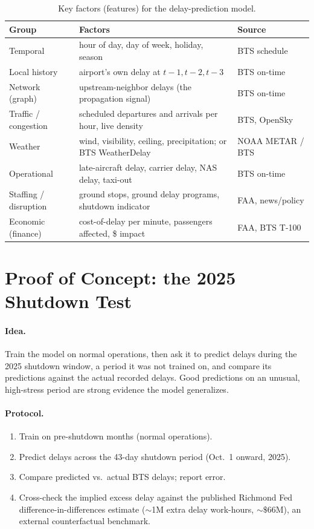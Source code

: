 \documentclass[11pt]{article}
\begin{document}
\begin{table}[h]
\centering
\small
\caption{Key factors (features) for the delay-prediction model.}
\label{tab:factors}
\begin{tabular}{>{\raggedright}p{2.6cm} >{\raggedright}p{6.2cm} p{3.4cm}}
\toprule
\textbf{Group} & \textbf{Factors} & \textbf{Source} \\
\midrule
Temporal & hour of day, day of week, holiday, season & BTS schedule \\
Local history & airport's own delay at $t{-}1,t{-}2,t{-}3$ & BTS on-time \\
Network (graph) & upstream-neighbor delays (the propagation signal) & BTS on-time \\
Traffic / congestion & scheduled departures and arrivals per hour, live density & BTS, OpenSky \\
Weather & wind, visibility, ceiling, precipitation; or BTS WeatherDelay & NOAA METAR / BTS \\
Operational & late-aircraft delay, carrier delay, NAS delay, taxi-out & BTS on-time \\
Staffing / disruption & ground stops, ground delay programs, shutdown indicator & FAA, news/policy \\
Economic (finance) & cost-of-delay per minute, passengers affected, \$ impact & FAA, BTS T-100 \\
\bottomrule
\end{tabular}
\end{table}

\section{Proof of Concept: the 2025 Shutdown Test}
\paragraph{Idea.} Train the model on normal operations, then ask it to predict
delays during the 2025 shutdown window, a period it was not trained on, and
compare its predictions against the actual recorded delays. Good predictions on
an unusual, high-stress period are strong evidence the model generalizes.

\paragraph{Protocol.}
\begin{enumerate}
  \item Train on pre-shutdown months (normal operations).
  \item Predict delays across the 43-day shutdown period (Oct.\ 1 onward, 2025).
  \item Compare predicted vs.\ actual BTS delays; report error.
  \item Cross-check the implied excess delay against the published Richmond Fed
        difference-in-differences estimate ($\sim$1M extra delay work-hours,
        $\sim\$66$M), an external counterfactual benchmark.
\end{enumerate}
\end{document}
